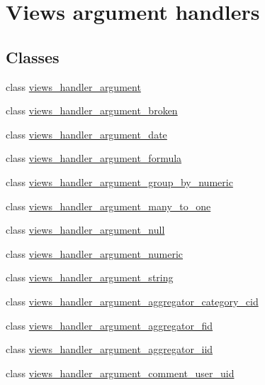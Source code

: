 \hypertarget{group__views__argument__handlers}{
\section{Views argument handlers}
\label{group__views__argument__handlers}
}
\subsection*{Classes}
\begin{DoxyCompactItemize}
\item 
class \hyperlink{classviews__handler__argument}{views\_\-handler\_\-argument}
\item 
class \hyperlink{classviews__handler__argument__broken}{views\_\-handler\_\-argument\_\-broken}
\item 
class \hyperlink{classviews__handler__argument__date}{views\_\-handler\_\-argument\_\-date}
\item 
class \hyperlink{classviews__handler__argument__formula}{views\_\-handler\_\-argument\_\-formula}
\item 
class \hyperlink{classviews__handler__argument__group__by__numeric}{views\_\-handler\_\-argument\_\-group\_\-by\_\-numeric}
\item 
class \hyperlink{classviews__handler__argument__many__to__one}{views\_\-handler\_\-argument\_\-many\_\-to\_\-one}
\item 
class \hyperlink{classviews__handler__argument__null}{views\_\-handler\_\-argument\_\-null}
\item 
class \hyperlink{classviews__handler__argument__numeric}{views\_\-handler\_\-argument\_\-numeric}
\item 
class \hyperlink{classviews__handler__argument__string}{views\_\-handler\_\-argument\_\-string}
\item 
class \hyperlink{classviews__handler__argument__aggregator__category__cid}{views\_\-handler\_\-argument\_\-aggregator\_\-category\_\-cid}
\item 
class \hyperlink{classviews__handler__argument__aggregator__fid}{views\_\-handler\_\-argument\_\-aggregator\_\-fid}
\item 
class \hyperlink{classviews__handler__argument__aggregator__iid}{views\_\-handler\_\-argument\_\-aggregator\_\-iid}
\item 
class \hyperlink{classviews__handler__argument__comment__user__uid}{views\_\-handler\_\-argument\_\-comment\_\-user\_\-uid}
\item 

\end{DoxyCompactItemize}
